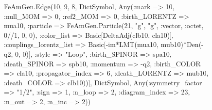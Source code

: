 \documentclass{revtex4}
\begin{document}
\begin{figure}[!htb]
\begin{center}
{FeAmGen.Edge(10, 9, 8, Dict{Symbol, Any}(:mark => 10, :null_MOM => 0, :ref2_MOM => 0, :birth_LORENTZ => mua10, :particle => FeAmGen.Particle(21, "g", "g", :vector, :octet, 0//1, 0, 0), :color_list => Basic[DeltaAdj(clb10, cla10)], :couplings_lorentz_list => Basic[-im*LMT(mua10, mub10)*Den(-q2, 0, 0)], :style => "Loop", :birth_SPINOR => spa10, :death_SPINOR => spb10, :momentum => -q2, :birth_COLOR => cla10, :propagator_index => 6, :death_LORENTZ => mub10, :death_COLOR => clb10))], Dict{Symbol, Any}(:symmetry_factor => "1/2", :sign => 1, :n_loop => 2, :diagram_index => 23, :n_out => 2, :n_inc => 2)) 
}
\end{center}
\end{figure}
\end{document}
